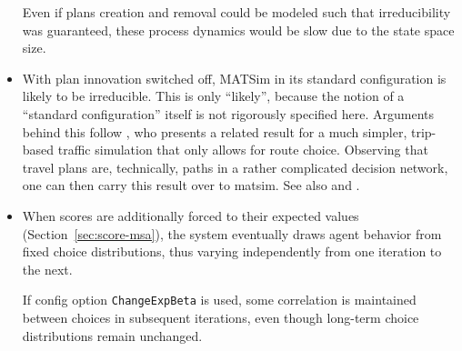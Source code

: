 \begin{itemize}
Even if plans creation and removal could be modeled such that irreducibility was guaranteed, these process dynamics would be slow due to the state space size.



\item With plan innovation switched off, 
MATSim in its standard configuration is likely to 
be irreducible.  This is only {}``likely'', because the notion of a {}``standard
configuration'' itself is not rigorously specified here. Arguments
behind this follow \citet{cascetta-1989}, who presents a related
result for a much simpler, trip-based traffic simulation that only
allows for route choice. Observing that travel plans are, technically,
paths in a rather complicated decision network, one can then carry
this result over to \gls{matsim}. See also \citet{NagelEtc2000tristan-succ} and
\citet{floetteroed-2010e}.





\item When scores are additionally forced to their 
expected values (Section~\ref{sec:score-msa}), the system eventually draws
agent behavior from fixed choice distributions, thus varying independently
from one iteration to the next.

If config option \lstinline|ChangeExpBeta| is used, some
correlation is maintained between choices in subsequent iterations, 
even though long-term choice distributions remain unchanged.

\end{itemize}

